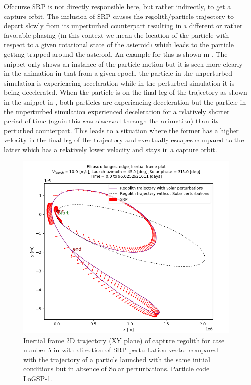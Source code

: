 Ofcourse \gls{SRP} is not directly responsible here, but rather indirectly, to get a capture orbit. The inclusion of \gls{SRP} causes the regolith/particle trajectory to depart slowly from its unperturbed counterpart resulting in a different or rather favorable phasing (in this context we mean the location of the particle with respect to a given rotational state of the asteroid) which leads to the particle getting trapped around the asteroid. An example for this is shown in . The snippet only shows an instance of the particle motion but it is seen more clearly in the animation in  that from a given epoch, the particle in the unperturbed simulation is experiencing acceleration while in the perturbed simulation it is being decelerated. When the particle is on the final leg of the trajectory as shown in the snippet in , both particles are experiencing deceleration but the particle in the unperturbed simulation experienced deceleration for a relatively shorter period of time (again this was observed through the animation) than its perturbed counterpart. This leads to a situation where the former has a higher velocity in the final leg of the trajectory and eventually escapes compared to the latter which has a relatively lower velocity and stays in a capture orbit.
\begin{figure}[htb]
\centering
\captionsetup{justification=centering}
\includegraphics[scale=0.60]{longest_edge_perturbations/3.2Density_1cmSize/singlePlot_comparative_PerturbationVector_10ms_45Azimuth_315SolarPhase_inertialFrame.png}
\caption{Inertial frame 2D trajectory (XY plane) of capture regolith for case number 5 in  with direction of \gls{SRP} perturbation vector compared with the trajectory of a particle launched with the same initial conditions but in absence of Solar perturbations. Particle code LoGSP-1.}
\label{fig:LoGSP_1_capture_case_5_2d_trajectory_comparative_inertialFrame}
\end{figure}
